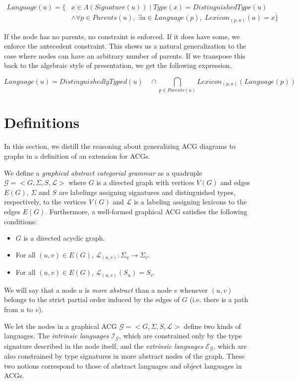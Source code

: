 \begin{align*}
Language(u) = \{&x \in \Lambda(Signature(u)) \mid Type(x) = DistinguishedType(u) \\
&\land \forall p \in Parents(u), \; \exists a \in Language(p), \; Lexicon_{(p,u)}(a) = x\}
\end{align*}

If the node has no parents, no constraint is enforced. If it does have
some, we enforce the antecedent constraint. This shows us a natural
generalization to the case where nodes can have an arbitrary number of
parents. If we transpose this back to the algebraic style of
presentation, we get the following expression.

$$
Language(u) = DistinguishedlyTyped(u) \quad \cap \bigcap_{p \in Parents(u)} Lexicon_{(p,u)}(Language(p))
$$


\section{Definitions}

In this section, we distill the reasoning about generalizing ACG
diagrams to graphs in a definition of an extension for ACGs.

We define a \emph{graphical abstract categorial grammar} as a quadruple
$\mathcal{G} = \mathopen{<} G, \Sigma, S, {\mathcal{L}} \mathclose{>}$
where $G$ is a directed graph with vertices $V(G)$ and edges $E(G)$,
$\Sigma$ and $S$ are labelings assigning signatures and distinguished
types, respectively, to the vertices $V(G)$ and ${\mathcal{L}}$ is a
labeling assigning lexicons to the edges $E(G)$. Furthermore, a
well-formed graphical ACG satisfies the following conditions:

\begin{itemize}
\item $G$ is a directed acyclic graph.
\item For all $(u,v) \in E(G)$, $\mathcal{L}_{(u,v)} : \Sigma_u \to
  \Sigma_v$.
\item For all $(u,v) \in E(G)$, $\mathcal{L}_{(u,v)}(S_u) = S_v$.
\end{itemize}

We will say that a node $u$ is \emph{more abstract} than a node $v$
whenever $(u,v)$ belongs to the strict partial order induced by the
edges of $G$ (i.e. there is a path from $u$ to $v$).

We let the nodes in a graphical ACG $\mathcal{G} = \mathopen{<} G,
\Sigma, S, \mathcal{L} \mathclose{>}$ define two kinds of languages. The
\emph{intrinsic languages} $\mathcal{I}_{\mathcal{G}}$, which are
constrained only by the type signature described in the node itself, and
the \emph{extrinsic languages} $\mathcal{E}_{\mathcal{G}}$, which are
also constrained by type signatures in more abstract nodes of the
graph. These two notions correspond to those of abstract languages and
object languages in ACGs.

